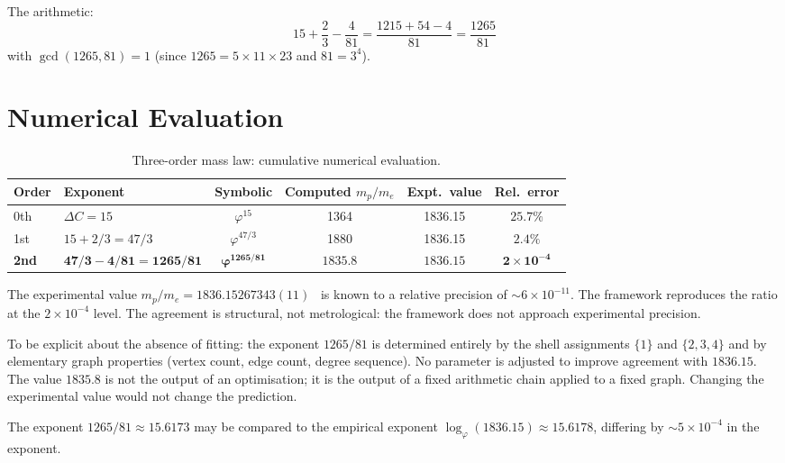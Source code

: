 \documentclass[12pt]{article}
\newcommand{\phig}{\varphi}
\begin{document}
The arithmetic:
\[
15 + \frac{2}{3} - \frac{4}{81} = \frac{1215 + 54 - 4}{81} = \frac{1265}{81}
\]
with $\gcd(1265, 81) = 1$ (since $1265 = 5 \times 11 \times 23$ and $81 = 3^4$).

\section{Numerical Evaluation}\label{sec:numerical}

\begin{table}[ht]
\centering
\caption{Three-order mass law: cumulative numerical evaluation.}
\label{tab:numerical}
\begin{tabular}{@{}llcccc@{}}
\toprule
Order & Exponent & Symbolic & Computed $m_p/m_e$ & Expt.\ value & Rel.\ error \\
\midrule
0th & $\Delta C = 15$ & $\phig^{15}$ & 1364 & 1836.15 & $25.7\%$ \\
1st & $15 + 2/3 = 47/3$ & $\phig^{47/3}$ & 1880 & 1836.15 & $2.4\%$ \\
\textbf{2nd} & $\boldsymbol{47/3 - 4/81 = 1265/81}$ & $\boldsymbol{\phig^{1265/81}}$ & $\boldsymbol{1835.8}$ & $\boldsymbol{1836.15}$ & $\boldsymbol{2 \times 10^{-4}}$ \\
\bottomrule
\end{tabular}
\end{table}

The experimental value $m_p/m_e = 1836.15267343(11)$~\citep{Workman2022} is known to a relative precision of $\sim\!6 \times 10^{-11}$. The framework reproduces the ratio at the $2 \times 10^{-4}$ level. The agreement is structural, not metrological: the framework does not approach experimental precision.

To be explicit about the absence of fitting: the exponent $1265/81$ is determined entirely by the shell assignments $\{1\}$ and $\{2,3,4\}$ and by elementary graph properties (vertex count, edge count, degree sequence). No parameter is adjusted to improve agreement with $1836.15$. The value $1835.8$ is not the output of an optimisation; it is the output of a fixed arithmetic chain applied to a fixed graph. Changing the experimental value would not change the prediction.

The exponent $1265/81 \approx 15.6173$ may be compared to the empirical exponent $\log_\phig(1836.15) \approx 15.6178$, differing by $\sim\!5 \times 10^{-4}$ in the exponent.
\end{document}
